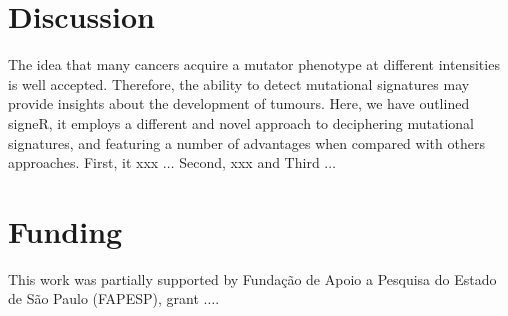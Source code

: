 \documentclass{bioinfo}
\begin{document}
\section{Discussion}
The idea that many cancers acquire a mutator phenotype at different 
intensities is well accepted. Therefore, the ability to detect 
mutational signatures may provide insights about the development of
tumours. Here, we have outlined signeR, it employs a different and 
novel approach to deciphering mutational signatures, and featuring a
number of advantages when compared with others approaches. First, it
xxx $\ldots$ Second, xxx and Third $\ldots$ 

\section*{Funding}
This work was partially supported by Funda\c{c}\~ao de Apoio a
Pesquisa do Estado de S\~ao Paulo (FAPESP), grant $\ldots$. 
\vspace*{-12pt}
 
 

\end{document}
